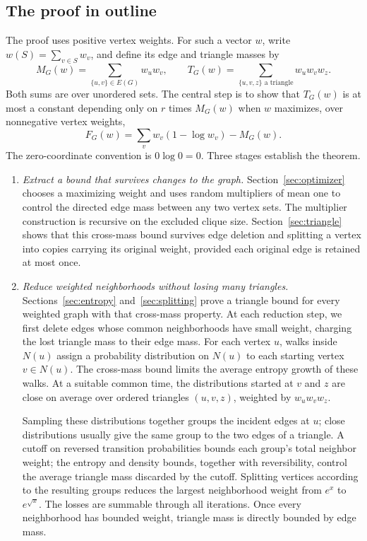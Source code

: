 \documentclass[11pt]{article}
\theoremstyle{definition}
\theoremstyle{remark}
\numberwithin{equation}{section}
\begin{document}
\subsection{The proof in outline}

The proof uses positive vertex weights. For such a vector $w$, write
$w(S)=\sum_{v\in S}w_v$, and define its edge and triangle masses by
\[
 M_G(w)=\sum_{\{u,v\}\in E(G)}w_uw_v,
 \qquad
 T_G(w)=\sum_{\{u,v,z\}\text{ a triangle}}w_uw_vw_z.
\]
Both sums are over unordered sets. The central step is to show that
$T_G(w)$ is at most a constant depending only on $r$ times $M_G(w)$
when $w$ maximizes, over nonnegative vertex weights,
\[
 F_G(w)=\sum_v w_v(1-\log w_v)-M_G(w).
\]
The zero-coordinate convention is $0\log0=0$.
Three stages establish the theorem.

\begin{enumerate}
\item \emph{Extract a bound that survives changes to the graph.}
Section~\ref{sec:optimizer} chooses a maximizing weight and uses random
multipliers of mean one to control the directed edge mass between any
two vertex sets. The multiplier construction is recursive on the excluded
clique size. Section~\ref{sec:triangle} shows that this cross-mass
bound survives edge deletion and splitting a vertex into copies carrying
its original weight, provided each original edge is retained at most once.

\item \emph{Reduce weighted neighborhoods without losing many triangles.}
Sections~\ref{sec:entropy} and~\ref{sec:splitting} prove a triangle bound
for every weighted graph with that cross-mass property. At each reduction
step, we first delete edges whose common neighborhoods have small weight,
charging the lost triangle mass to their edge mass. For each vertex
$u$, walks inside $N(u)$ assign a probability distribution on $N(u)$ to
each starting vertex $v\in N(u)$. The cross-mass bound limits the average
entropy growth of these walks. At a suitable common time, the distributions
started at $v$ and $z$ are close on average over ordered triangles $(u,v,z)$,
weighted by $w_uw_vw_z$.

Sampling these distributions together groups the incident edges at $u$;
close distributions usually give the same group to the two edges of a
triangle. A cutoff on reversed transition probabilities bounds each
group's total neighbor weight; the entropy and density bounds, together
with reversibility, control the average triangle mass discarded by the
cutoff. Splitting vertices according to
the resulting groups reduces the largest neighborhood weight from
$e^x$ to $e^{\sqrt{x}}$. The losses are summable through all iterations.
Once every neighborhood has bounded weight, triangle mass is directly
bounded by edge mass.


\end{enumerate}
\end{document}
